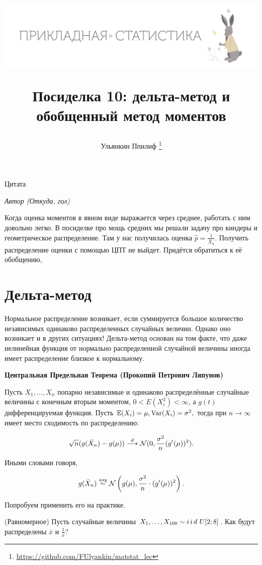 \documentclass[12pt, a4paper, oneside]{article}
\title{
\begin{center} 
\includegraphics[width=0.99\textwidth]{logo.png}
\end{center}

Посиделка 10: дельта-метод и обобщенный метод моментов}
\date{ } %
\author{Ульянкин Ппилиф \thanks{\url{https://github.com/FUlyankin/matstat_lec}}}
\begin{document}

\maketitle

\epigraph{\hfill Цитата}{\textit{Автор (Откуда, гол)}}

Когда оценка моментов в явном виде выражается через среднее, работать с ним довольно легко. В посиделке про мощь средних мы решали задачу про киндеры и геометрическое распределение. Там у нас получилась оценка $\hat{p} = \frac{1}{\bar{X}_n}.$ Получить распределение оценки с помощью ЦПТ не выйдет. Придётся обратиться к её обобщению,  

\section{Дельта-метод}

Нормальное распределение возникает, если суммируется большое количество независимых одинаково распределенных случайных величин. Однако оно возникает и в других ситуациях! Дельта-метод основан на том факте, что даже нелинейная функция от нормально распределенной случайной величины  иногда имеет распределение близкое к нормальному.

\begin{theorem}{\textbf{Центральная Предельная Теорема (Прокопий Петрович Ляпунов)}}

Пусть $X_1, \ldots, X_n$ попарно независимые и одинаково распределённые случайные величины с конечным вторым моментом, $0 < E(X_i^2) < \infty$, а $g(t)$ дифференцируемая функция. Пусть $\mathbb{E}(X_i) = \mu, \operatorname{Var}(X_i) = \sigma^2,$ тогда при $n \to \infty$ имеет место сходимость по распределению: 

\[
\sqrt{n} (g(\bar X_n) - g(\mu)) \stackrel{d}{\longrightarrow} \mathcal{N}(0, \frac{\sigma^2}{n} (g'(\mu))^2 ).
\]

Иными словами говоря, 

\[
g(\bar{X}_n) \overset{\text{\textit{asy}}}{\sim} \mathcal{N} \left(g(\mu), \frac{\sigma^2}{n} \cdot (g'(\mu))^2 \right).\] 
\end{theorem}

Попробуем применить его на практике. 

\begin{problem}{(Равномерное)}
Пусть случайные величины $X_1, \ldots, X_{100} \sim i\,i\,d\,\, U[2;8]$. Как будут распределены $\bar{x}$ и $\frac{1}{\bar{x}}$? 
\end{problem} 
\end{document}
